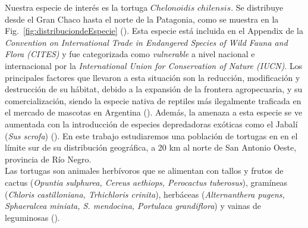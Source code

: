Nuestra especie de interés es la tortuga $Chelonoidis$ $chilensis$. Se distribuye desde el Gran Chaco hasta el norte de la Patagonia, como se muestra en la Fig.~\ref{fig:distribuciondeEspecie} (\cite{chebez2008se}). Esta especie está incluida en el Appendix  de la \textit{Convention on International Trade in Endangered Species of Wild Fauna and Flora (CITES)} y fue categorizada como \textit{vulnerable} a nivel nacional \cite{prado2012categorizacion} e internacional por la \textit{International Union for Conservation of Nature (IUCN)}.
Los principales factores que llevaron a esta situación son la reducción, modificación y destrucción de su hábitat, debido a la expansión de la frontera agropecuaria, y su comercialización, siendo la especie nativa de reptiles más ilegalmente traficada en el mercado de mascotas en Argentina (\cite{prado2012categorizacion}). Además, la amenaza a esta especie se ve aumentada con la introducción de especies depredadoras exóticas como el Jabalí (\textit{Sus scrofa}) (\cite{kubisch2014chelonoidis}). En este trabajo estudiaremos una población de tortugas en en el límite sur de su distribución geográfica, a 20 km al norte de San Antonio Oeste, provincia de Río Negro.  \\
   
Las tortugas son animales  herbívoros que se alimentan con tallos y frutos de cactus (\textit{Opuntia sulphurea, Cereus aethiops, Perocactus tuberosus}), gramíneas (\textit{Chloris castilloniana, Trhichloris crinita}), herbáceas (\textit{Alternanthera pugens, Sphaeralcea miniata, S. mendocina, Portulaca grandiflora}) y vainas de leguminosas (\cite{zacarias2016biologia}).
   
   
   

